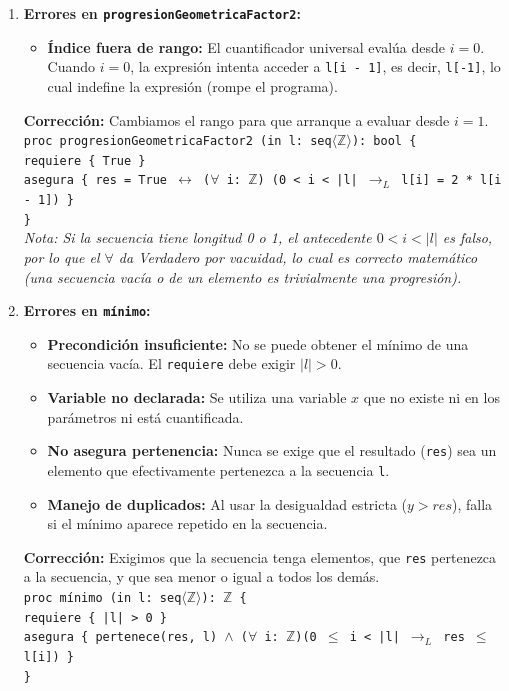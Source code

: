 \begin{enumerate}[label=\textbf{\alph*)}]

    \item \textbf{Errores en \texttt{progresionGeometricaFactor2}:}
    \begin{itemize}
        \item \textbf{Índice fuera de rango:} El cuantificador universal evalúa desde $i=0$. Cuando $i=0$, la expresión intenta acceder a \texttt{l[i - 1]}, es decir, \texttt{l[-1]}, lo cual indefine la expresión (rompe el programa).
    \end{itemize}
    \textbf{Corrección:} Cambiamos el rango para que arranque a evaluar desde $i=1$. \\
    \texttt{proc progresionGeometricaFactor2 (in l: seq$\langle\mathbb{Z}\rangle$): bool \{} \\
    \texttt{\hspace*{0.5cm}requiere \{ True \}} \\
    \texttt{\hspace*{0.5cm}asegura \{ res = True $\leftrightarrow$ ($\forall$ i: $\mathbb{Z}$) (0 < i < |l| $\rightarrow_L$ l[i] = 2 * l[i - 1]) \}} \\
    \texttt{\}} \\
    \textit{Nota: Si la secuencia tiene longitud 0 o 1, el antecedente $0 < i < |l|$ es falso, por lo que el $\forall$ da Verdadero por vacuidad, lo cual es correcto matemático (una secuencia vacía o de un elemento es trivialmente una progresión).}

    \vspace{0.4cm}
    \item \textbf{Errores en \texttt{mínimo}:}
    \begin{itemize}
        \item \textbf{Precondición insuficiente:} No se puede obtener el mínimo de una secuencia vacía. El \texttt{requiere} debe exigir $|l| > 0$.
        \item \textbf{Variable no declarada:} Se utiliza una variable $x$ que no existe ni en los parámetros ni está cuantificada.
        \item \textbf{No asegura pertenencia:} Nunca se exige que el resultado (\texttt{res}) sea un elemento que efectivamente pertenezca a la secuencia \texttt{l}.
        \item \textbf{Manejo de duplicados:} Al usar la desigualdad estricta ($y > res$), falla si el mínimo aparece repetido en la secuencia.
    \end{itemize}
\newpage
    \textbf{Corrección:} Exigimos que la secuencia tenga elementos, que \texttt{res} pertenezca a la secuencia, y que sea menor o igual a todos los demás. \\
    \texttt{proc mínimo (in l: seq$\langle\mathbb{Z}\rangle$): $\mathbb{Z}$ \{} \\
    \texttt{\hspace*{0.5cm}requiere \{ |l| > 0 \}} \\
    \texttt{\hspace*{0.5cm}asegura \{ pertenece(res, l) $\wedge$ ($\forall$ i: $\mathbb{Z}$)(0 $\leq$ i < |l| $\rightarrow_L$ res $\leq$ l[i]) \}} \\
    \texttt{\}}


\end{enumerate}
